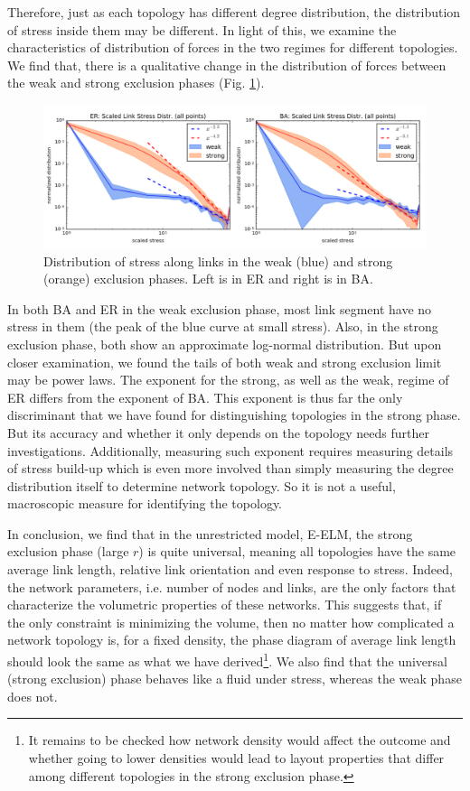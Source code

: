 \documentclass[nofootinbib,preprint,floatfix,endfloats]{revtex4} %
\begin{document}
Therefore, just as each topology has different degree distribution, the distribution of stress inside them may be different. 
In light of this, we examine the characteristics of distribution of forces in the two regimes for different topologies. 
We find that, there is a qualitative change in the distribution of forces between the weak and strong exclusion phases (Fig. \ref{fig:Tdist}). 
\begin{figure}
    \centering
    \includegraphics[width=.8\columnwidth]{fig-09-19/stress-dist.png}
    \caption{Distribution of stress along links in the weak (blue) and strong (orange) exclusion phases. Left is in ER and right is in BA. }
    \label{fig:Tdist}
\end{figure}
In both BA and ER in the weak exclusion phase, most link segment have no stress in them (the peak of the blue curve at small stress).
Also, in the strong exclusion phase, both show an approximate log-normal distribution. 
But upon closer examination, we found the tails of both weak and strong exclusion limit may be power laws. The exponent for the strong, as well as the weak, regime of ER differs from the exponent of BA. 
This exponent is thus far the only discriminant that we have found for distinguishing topologies in the strong phase. 
But its accuracy and whether it only depends on the topology needs further investigations. 
Additionally, measuring such exponent requires measuring details of stress build-up which is even more involved than simply measuring the degree distribution itself to determine network topology. 
So it is not a useful, macroscopic measure for identifying the topology.



In conclusion, we find that in the unrestricted model, E-ELM, the strong exclusion phase (large $r$) is quite universal, meaning all topologies have the same average link length, relative link orientation and even response to stress. 
Indeed, the network parameters, i.e. number of nodes and links, are the only factors that characterize the volumetric properties of these networks. 
This suggests that, if the only constraint is minimizing the volume, then no matter how complicated a network topology is, for a fixed density, the phase diagram of average link length should look the same as what we have derived\footnote{
It remains to be checked how network density would affect the outcome and whether going to lower densities would lead to layout properties that differ among different topologies in the strong exclusion phase.}.
We also find that the universal (strong exclusion) phase behaves like a fluid under stress, whereas the weak phase does not.   
\end{document}
